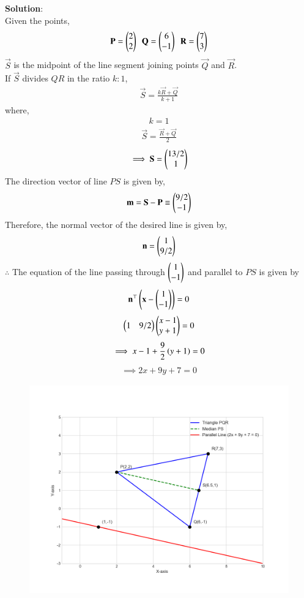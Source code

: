\documentclass[journal]{IEEEtran}
\begin{document}
\textbf{Solution}:\\
Given the points,\\
\begin{align}
\mathbf{P}=\begin{pmatrix}2\\2\end{pmatrix}\ \ \mathbf{Q}=\begin{pmatrix}6\\-1\end{pmatrix}\ \ \mathbf{R}=\begin{pmatrix}7\\3\end{pmatrix}
\end{align}
$\vec{S}$ is the midpoint of the line segment joining points $\vec{Q}$ and $\vec{R}$.\\
If $\vec{S}$ divides $QR$ in the ratio $k : 1$,
		\begin{align}
			\vec{S}= \frac{k\vec{R}+\vec{Q}}{k+1}
		\end{align}
where,
\begin{align}
    k=1
\end{align}
\begin{align}
    \vec{S}= \frac{\vec{R}+\vec{Q}}{2}
\end{align}
\begin{align}
    \implies\mathbf{S}= \begin{pmatrix}13/2\\1\end{pmatrix}
\end{align}
The direction vector of line $PS$ is given by,
\begin{align}
\mathbf{m}=\mathbf{S}-\mathbf{P} \equiv \begin{pmatrix}9/2\\-1\end{pmatrix}
\end{align}
Therefore, the normal vector of the desired line is given by,
\begin{align}
    \mathbf{n}=\begin{pmatrix}1\\9/2\end{pmatrix}
\end{align}
$\therefore$ The equation of the line passing through $\begin{pmatrix}1\\-1\end{pmatrix}$ and parallel to $PS$ is given by
\begin{align}
    \mathbf{n}^{\top}\left(\mathbf{x}-\begin{pmatrix}1\\-1\end{pmatrix}\right)=0
\end{align}
\begin{align}
    \begin{pmatrix}1 & 9/2\end{pmatrix}\begin{pmatrix}x-1\\y+1\end{pmatrix}=0
\end{align}
\begin{align}
    \implies x-1 + \frac{9}{2}\left(y+1\right)=0
\end{align}
\begin{align}
    \implies 2x+9y+7=0
\end{align}
\begin{figure}[H]
\begin{center}
\includegraphics[width=0.8\columnwidth]{figs/fig.png}
\end{center}
\end{figure}
\end{document}
